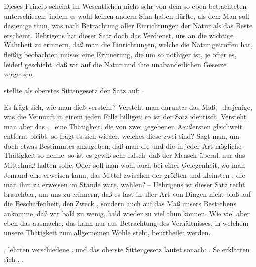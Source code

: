 Dieses Princip scheint im Wesentlichen nicht sehr von dem so eben betrachteten unterschieden; indem es wohl keinen andern Sinn haben dürfte, als den: Man soll dasjenige thun, was nach Betrachtung aller Einrichtungen der Natur als das Beste erscheint. Uebrigens hat dieser Satz doch das Verdienst, uns an die wichtige Wahrheit zu erinnern, daß man die Einrichtungen, welche die Natur getroffen hat, fleißig beobachten müsse; eine Erinnerung, die um so nöthiger ist, je öfter es, leider! geschieht, daß wir auf die Natur und ihre unabänderlichen Gesetze vergessen.
\begin{aufza}\setcounter{enumi}{9}
\item {} stellte als oberstes Sittengesetz den Satz auf: .
\end{aufza}\par
Es frägt sich, wie man dieß  verstehe? Versteht man darunter das  Maß, \dh\ dasjenige, was die Vernunft in einem jeden Falle billiget: so ist der Satz identisch. Versteht man aber das , \dh\ eine Thätigkeit, die von zwei gegebenen Aeußersten gleichweit entfernt bleibt: so frägt es sich wieder, welches diese zwei  sind? Sagt man, um doch etwas Bestimmtes anzugeben, daß man die  und die  in jeder Art mögliche Thätigkeit so nenne: so ist es gewiß sehr falsch, daß der Mensch überall nur das Mittelmaß halten solle. Oder soll man wohl auch bei einer Gelegenheit, wo man Jemand eine  erweisen kann, das Mittel zwischen der größten und kleinsten , die man ihm zu erweisen im Stande wäre, wählen? -- Uebrigens ist dieser Satz recht brauchbar, um uns zu erinnern, daß es fast in aller Art von Dingen nicht bloß auf die Beschaffenheit, den Zweck \usw , sondern auch auf das Maß unsers Bestrebens ankomme, daß wir bald zu wenig, bald wieder zu viel thun können. Wie viel aber eben das  ausmache, das kann nur aus Betrachtung des Verhältnisses, in welchem unsere Thätigkeit zum allgemeinen Wohle steht, beurtheilet werden.
\begin{aufza}\setcounter{enumi}{10}
\item {}, lehrten verschiedene , und das oberste Sittengesetz lautet sonach: . So erklärten sich , , \uA ~
\end{aufza}\par
